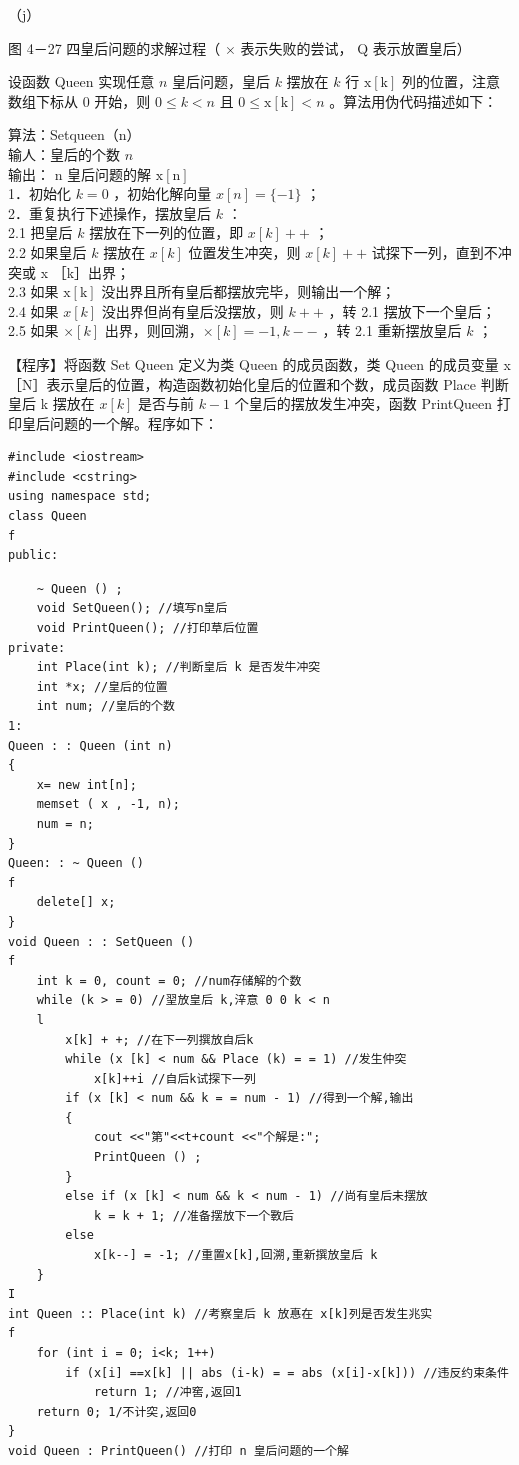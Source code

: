 \documentclass[10pt]{article}
\begin{document}
（j）

图 4－27 四皇后问题的求解过程（ $\times$ 表示失败的尝试， Q 表示放置皇后）

设函数 Queen 实现任意 $n$ 皇后问题，皇后 $k$ 摆放在 $k$ 行 $\mathrm{x}[\mathrm{k}]$ 列的位置，注意数组下标从 0 开始，则 $0 \leqslant k<n$ 且 $0 \leqslant \mathrm{x}[\mathrm{k}]<n$ 。算法用伪代码描述如下：

算法：Setqueen（n）\\
输人：皇后的个数 $n$\\
输出： n 皇后问题的解 $\mathrm{x}[\mathrm{n}]$\\
1．初始化 $k=0$ ，初始化解向量 $x[n]=\{-1\}$ ；\\
2．重复执行下述操作，摆放皇后 $k$ ：\\
2.1 把皇后 $k$ 摆放在下一列的位置，即 $x[k]++$ ；\\
2.2 如果皇后 $k$ 摆放在 $x[k]$ 位置发生冲突，则 $x[k]++$ 试探下一列，直到不冲突或 x ［k］出界；\\
2.3 如果 $\mathrm{x}[\mathrm{k}]$ 没出界且所有皇后都摆放完毕，则输出一个解；\\
2.4 如果 $x[k]$ 没出界但尚有皇后没摆放，则 $k++$ ，转 2.1 摆放下一个皇后；\\
2.5 如果 $\times[k]$ 出界，则回溯，$\times[k]=-1, k--$ ，转 2.1 重新摆放皇后 $k$ ；

【程序】将函数 Set Queen 定义为类 Queen 的成员函数，类 Queen 的成员变量 x［N］表示皇后的位置，构造函数初始化皇后的位置和个数，成员函数 Place 判断皇后 k 摆放在 $x[k]$ 是否与前 $k-1$ 个皇后的摆放发生冲突，函数 PrintQueen 打印皇后问题的一个解。程序如下：

\begin{verbatim}
#include <iostream>
#include <cstring>
using namespace std;
class Queen
f
public:
\end{verbatim}

\begin{verbatim}
    ~ Queen () ;
    void SetQueen(); //填写n皇后
    void PrintQueen(); //打印草后位置
private:
    int Place(int k); //判断皇后 k 是否发牛冲突
    int *x; //皇后的位置
    int num; //皇后的个数
1:
Queen : : Queen (int n)
{
    x= new int[n];
    memset ( x , -1, n);
    num = n;
}
Queen: : ~ Queen ()
f
    delete[] x;
}
void Queen : : SetQueen ()
f
    int k = 0, count = 0; //num存储解的个数
    while (k > = 0) //䍿放皇后 k,㳯意 0 0 k < n
    l
        x[k] + +; //在下一列撰放自后k
        while (x [k] < num && Place (k) = = 1) //发生仲突
            x[k]++i //自后k试探下一列
        if (x [k] < num && k = = num - 1) //得到一个解,输出
        {
            cout <<"第"<<t+count <<"个解是:";
            PrintQueen () ;
        }
        else if (x [k] < num && k < num - 1) //尚有皇后未摆放
            k = k + 1; //准备摆放下一个斁后
        else
            x[k--] = -1; //重置x[k],回溯,重新撰放皇后 k
    }
I
int Queen :: Place(int k) //考察皇后 k 放惪在 x[k]列是否发生兆实
f
    for (int i = 0; i<k; 1++)
        if (x[i] ==x[k] || abs (i-k) = = abs (x[i]-x[k])) //违反约束条件
            return 1; //冲窖,返回1
    return 0; 1/不计突,返回0
}
void Queen : PrintQueen() //打印 n 皇后问题的一个解
\end{verbatim}
\end{document}
